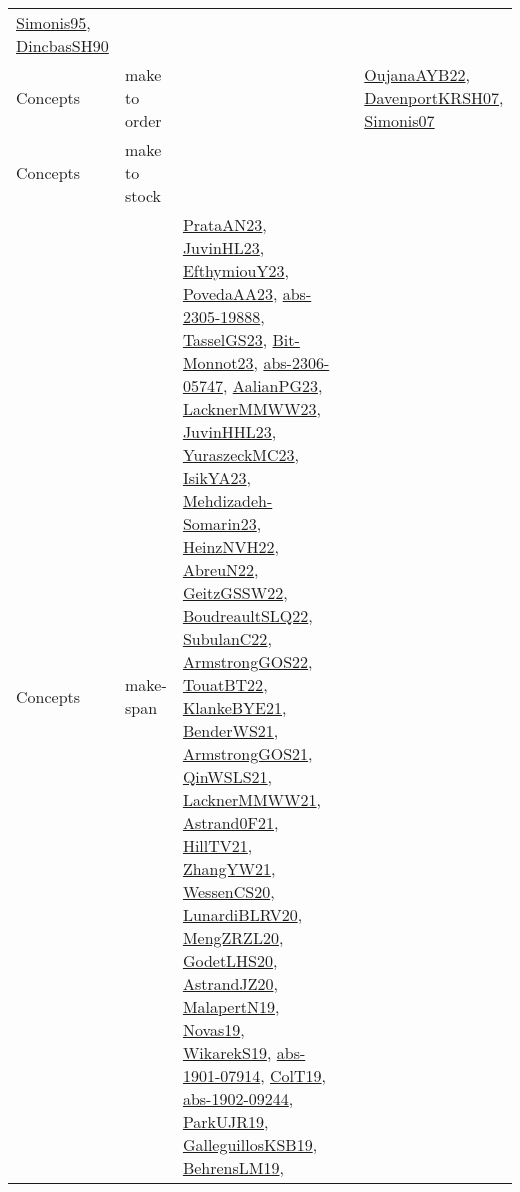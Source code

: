 {\begin{longtable}{lp{3cm}>{\raggedright}p{6cm}>{\raggedright}p{6cm}p{8cm}}
\href{papers/Simonis95.pdf}{Simonis95}\cite{Simonis95}, \href{articles/DincbasSH90.pdf}{DincbasSH90}\cite{DincbasSH90}\\
Concepts & make to order &  &  & \href{papers/OujanaAYB22.pdf}{OujanaAYB22}\cite{OujanaAYB22}, \href{papers/DavenportKRSH07.pdf}{DavenportKRSH07}\cite{DavenportKRSH07}, \href{articles/Simonis07.pdf}{Simonis07}\cite{Simonis07}\\
Concepts & make to stock &  &  & \\
Concepts & make-span & \href{articles/PrataAN23.pdf}{PrataAN23}\cite{PrataAN23}, \href{papers/JuvinHL23.pdf}{JuvinHL23}\cite{JuvinHL23}, \href{papers/EfthymiouY23.pdf}{EfthymiouY23}\cite{EfthymiouY23}, \href{papers/PovedaAA23.pdf}{PovedaAA23}\cite{PovedaAA23}, \href{articles/abs-2305-19888.pdf}{abs-2305-19888}\cite{abs-2305-19888}, \href{papers/TasselGS23.pdf}{TasselGS23}\cite{TasselGS23}, \href{papers/Bit-Monnot23.pdf}{Bit-Monnot23}\cite{Bit-Monnot23}, \href{articles/abs-2306-05747.pdf}{abs-2306-05747}\cite{abs-2306-05747}, \href{papers/AalianPG23.pdf}{AalianPG23}\cite{AalianPG23}, \href{articles/LacknerMMWW23.pdf}{LacknerMMWW23}\cite{LacknerMMWW23}, \href{papers/JuvinHHL23.pdf}{JuvinHHL23}\cite{JuvinHHL23}, \href{papers/YuraszeckMC23.pdf}{YuraszeckMC23}\cite{YuraszeckMC23}, \href{articles/IsikYA23.pdf}{IsikYA23}\cite{IsikYA23}, \href{papers/Mehdizadeh-Somarin23.pdf}{Mehdizadeh-Somarin23}\cite{Mehdizadeh-Somarin23}, \href{articles/HeinzNVH22.pdf}{HeinzNVH22}\cite{HeinzNVH22}, \href{articles/AbreuN22.pdf}{AbreuN22}\cite{AbreuN22}, \href{papers/GeitzGSSW22.pdf}{GeitzGSSW22}\cite{GeitzGSSW22}, \href{papers/BoudreaultSLQ22.pdf}{BoudreaultSLQ22}\cite{BoudreaultSLQ22}, \href{articles/SubulanC22.pdf}{SubulanC22}\cite{SubulanC22}, \href{papers/ArmstrongGOS22.pdf}{ArmstrongGOS22}\cite{ArmstrongGOS22}, \href{papers/TouatBT22.pdf}{TouatBT22}\cite{TouatBT22}, \href{papers/KlankeBYE21.pdf}{KlankeBYE21}\cite{KlankeBYE21}, \href{papers/BenderWS21.pdf}{BenderWS21}\cite{BenderWS21}, \href{papers/ArmstrongGOS21.pdf}{ArmstrongGOS21}\cite{ArmstrongGOS21}, \href{articles/QinWSLS21.pdf}{QinWSLS21}\cite{QinWSLS21}, \href{papers/LacknerMMWW21.pdf}{LacknerMMWW21}\cite{LacknerMMWW21}, \href{papers/Astrand0F21.pdf}{Astrand0F21}\cite{Astrand0F21}, \href{papers/HillTV21.pdf}{HillTV21}\cite{HillTV21}, \href{articles/ZhangYW21.pdf}{ZhangYW21}\cite{ZhangYW21}, \href{papers/WessenCS20.pdf}{WessenCS20}\cite{WessenCS20}, \href{articles/LunardiBLRV20.pdf}{LunardiBLRV20}\cite{LunardiBLRV20}, \href{articles/MengZRZL20.pdf}{MengZRZL20}\cite{MengZRZL20}, \href{papers/GodetLHS20.pdf}{GodetLHS20}\cite{GodetLHS20}, \href{articles/AstrandJZ20.pdf}{AstrandJZ20}\cite{AstrandJZ20}, \href{papers/MalapertN19.pdf}{MalapertN19}\cite{MalapertN19}, \href{articles/Novas19.pdf}{Novas19}\cite{Novas19}, \href{articles/WikarekS19.pdf}{WikarekS19}\cite{WikarekS19}, \href{articles/abs-1901-07914.pdf}{abs-1901-07914}\cite{abs-1901-07914}, \href{papers/ColT19.pdf}{ColT19}\cite{ColT19}, \href{articles/abs-1902-09244.pdf}{abs-1902-09244}\cite{abs-1902-09244}, \href{papers/ParkUJR19.pdf}{ParkUJR19}\cite{ParkUJR19}, \href{papers/GalleguillosKSB19.pdf}{GalleguillosKSB19}\cite{GalleguillosKSB19}, \href{papers/BehrensLM19.pdf}{BehrensLM19}\cite{BehrensLM19}, 
\end{longtable}}
